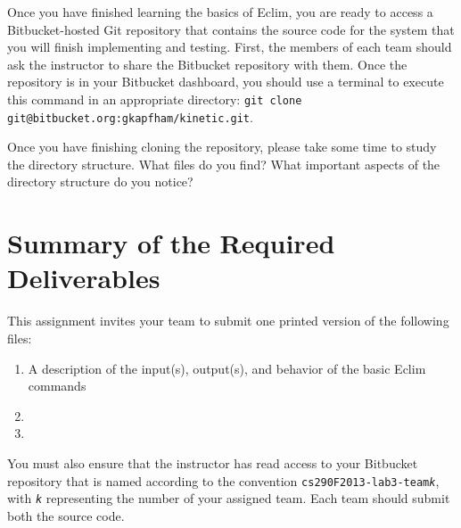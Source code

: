 Once you have finished learning the basics of Eclim, you are ready to access a Bitbucket-hosted Git repository that
contains the source code for the system that you will finish implementing and testing.  First, the members of each team
should ask the instructor to share the Bitbucket repository with them. Once the repository is in your Bitbucket
dashboard, you should use a terminal to execute this command in an appropriate directory: {\tt git clone
git@bitbucket.org:gkapfham/kinetic.git}.

Once you have finishing cloning the repository, please take some time to study the directory structure.  What files do
you find? What important aspects of the directory structure do you notice?

\section*{Summary of the Required Deliverables}

This assignment invites your team to submit one printed version of the following files:

\begin{enumerate}
	
	\item A description of the input(s), output(s), and behavior of the basic Eclim commands 
	\item 
	\item 

\end{enumerate}

You must also ensure that the instructor has read access to your Bitbucket repository that is named according to the
convention {\tt cs290F2013-lab3-team{\em k}}, with {\tt {\em k}} representing the number of your assigned team. 
Each team should submit both the source code.


